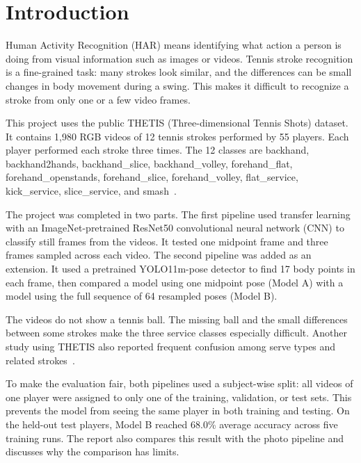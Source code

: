 \documentclass[12pt,a4paper]{article}
\begin{document}
\newpage
{}
\tableofcontents
\newpage
\listoffigures
\newpage
\listoftables
\newpage
{}

\section{Introduction}
Human Activity Recognition (HAR) means identifying what action a person is doing from visual information such as images or videos. Tennis stroke recognition is a fine-grained task: many strokes look similar, and the differences can be small changes in body movement during a swing. This makes it difficult to recognize a stroke from only one or a few video frames.

This project uses the public THETIS (Three-dimensional Tennis Shots) dataset. It contains 1,980 RGB videos of 12 tennis strokes performed by 55 players. Each player performed each stroke three times. The 12 classes are backhand, backhand2hands, backhand\_slice, backhand\_\allowbreak volley, forehand\_flat, forehand\_\allowbreak openstands, forehand\_slice, forehand\_\allowbreak volley, flat\_\allowbreak service, kick\_\allowbreak service, slice\_\allowbreak service, and smash~\cite{gourgari2013thetis}.

The project was completed in two parts. The first pipeline used transfer learning with an ImageNet-pretrained ResNet50 convolutional neural network (CNN) to classify still frames from the videos. It tested one midpoint frame and three frames sampled across each video. The second pipeline was added as an extension. It used a pretrained YOLO11m-pose detector to find 17 body points in each frame, then compared a model using one midpoint pose (Model A) with a model using the full sequence of 64 resampled poses (Model B).

The videos do not show a tennis ball. The missing ball and the small differences between some strokes make the three service classes especially difficult. Another study using THETIS also reported frequent confusion among serve types and related strokes~\cite{hovad2024classification}.

To make the evaluation fair, both pipelines used a subject-wise split: all videos of one player were assigned to only one of the training, validation, or test sets. This prevents the model from seeing the same player in both training and testing. On the held-out test players, Model B reached 68.0\% average accuracy across five training runs. The report also compares this result with the photo pipeline and discusses why the comparison has limits.
\end{document}
